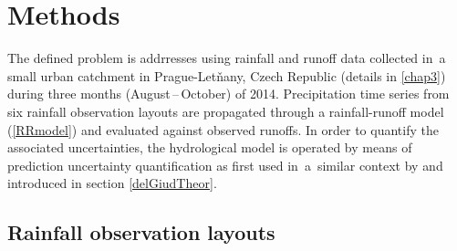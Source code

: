 \documentclass{ctuthesis}\usepackage[]{graphicx}\usepackage[]{color}
\begin{document}
 
\section{Methods} \label{pilotMnM}

The defined problem is addrresses using rainfall and runoff data collected in~a small urban catchment in Prague-Letňany, Czech Republic (details in \ref{chap3}) during three months (August\,--\,October) of 2014. Precipitation time series from six rainfall observation layouts are propagated through a rainfall-runoff model (\ref{RRmodel}) and evaluated against observed runoffs. In order to quantify the associated uncertainties, the hydrological model is operated by means of prediction uncertainty quantification as first used in~a~similar context by \cite{giudice2013improving} and introduced in section \ref{delGiudTheor}.


\subsection{Rainfall observation layouts} 
\end{document}
